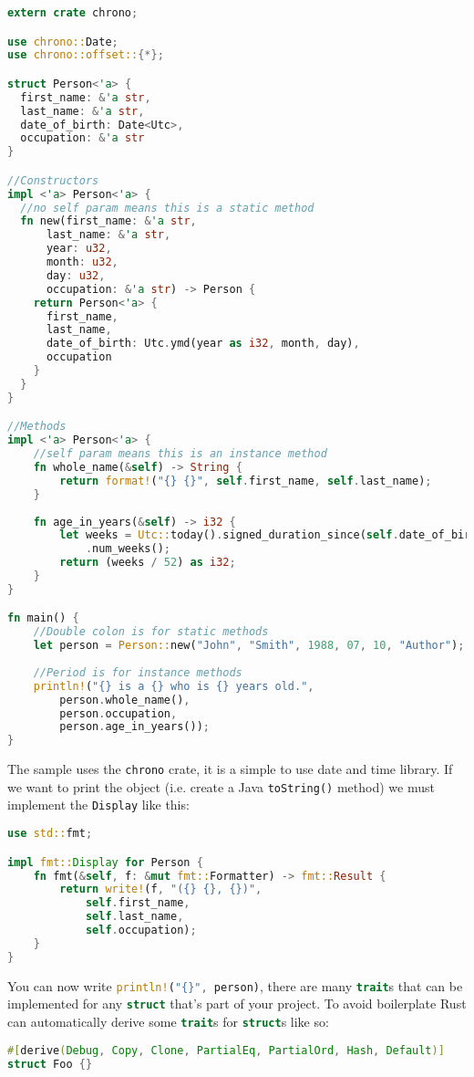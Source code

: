 \documentclass[a4paper,11pt]{article}
\begin{document}
\begin{lstlisting}[language=Rust,frame=single]
extern crate chrono;

use chrono::Date;
use chrono::offset::{*};

struct Person<'a> {
  first_name: &'a str,
  last_name: &'a str,
  date_of_birth: Date<Utc>,
  occupation: &'a str
}

//Constructors
impl <'a> Person<'a> {
  //no self param means this is a static method
  fn new(first_name: &'a str, 
      last_name: &'a str, 
      year: u32,
      month: u32, 
      day: u32, 
      occupation: &'a str) -> Person {
    return Person<'a> {
      first_name,
      last_name,
      date_of_birth: Utc.ymd(year as i32, month, day),
      occupation
    }
  }
}

//Methods
impl <'a> Person<'a> {
    //self param means this is an instance method
    fn whole_name(&self) -> String {
        return format!("{} {}", self.first_name, self.last_name);
    }  
    
    fn age_in_years(&self) -> i32 {
        let weeks = Utc::today().signed_duration_since(self.date_of_birth)
            .num_weeks();
        return (weeks / 52) as i32;
    }
}

fn main() {
    //Double colon is for static methods
    let person = Person::new("John", "Smith", 1988, 07, 10, "Author");
    
    //Period is for instance methods
    println!("{} is a {} who is {} years old.", 
        person.whole_name(), 
        person.occupation, 
        person.age_in_years());
}
\end{lstlisting}

The sample uses the \lstinline{chrono} crate, it is a simple to use date and time library. 
If we want to print the object (i.e. create a Java \lstinline{toString()} method) we must implement the \lstinline{Display} like this:

\begin{lstlisting}[language=Rust,frame=single]
use std::fmt;

impl fmt::Display for Person {
    fn fmt(&self, f: &mut fmt::Formatter) -> fmt::Result {
        return write!(f, "({} {}, {})", 
            self.first_name, 
            self.last_name, 
            self.occupation);
    }
}
\end{lstlisting}

You can now write \lstinline[language=Rust]|println!("{}", person)|, there are many \lstinline[language=Rust]{trait}s that can be implemented for any \lstinline[language=Rust]{struct} that's part of your project.\newline
To avoid boilerplate Rust can automatically derive some \lstinline[language=Rust]{trait}s for \lstinline[language=Rust]{struct}s like so:
\begin{lstlisting}[language=Rust,frame=single]
#[derive(Debug, Copy, Clone, PartialEq, PartialOrd, Hash, Default)]
struct Foo {}
\end{lstlisting}
\end{document}
